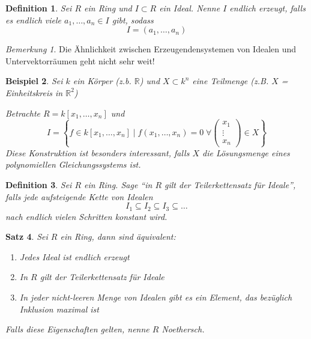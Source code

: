 \documentclass[a4paper,12pt,numbers=noenddot,parskip=full]{scrartcl}
\newcommand{\setR}{\mathbb{R}}
\theoremstyle{dotless}
\newtheorem{theorem}{Satz}[section]
\newtheorem{definition}[theorem]{Definition}
\newtheorem{example}[theorem]{Beispiel}
\theoremstyle{remark}
\newtheorem*{remark}{Bemerkung}
\begin{document}
	\begin{definition}
		Sei $R$ ein Ring und $I \subset R$ ein Ideal. Nenne $I$ endlich erzeugt, falls es endlich viele $a_1, \dots, a_n \in I$ gibt, sodass
		\begin{equation*}
			I = (a_1, \dots, a_n)
		\end{equation*}
	\end{definition}

	\begin{remark}
		Die Ähnlichkeit zwischen Erzeugendensystemen von Idealen und Untervektorräumen geht nicht sehr weit!
	\end{remark}

	\begin{example}
		Sei $k$ ein Körper (z.b. $\setR$) und $X \subset k^n$ eine Teilmenge (z.B. $X$ = Einheitskreis in $\setR^2$)
		
		Betrachte $R = k[x_1, \dots, x_n]$ und
		\begin{equation*}
			I = \left\{ f \in k[x_1, \dots, x_n] \mid f(x_1, \dots, x_n) = 0 \;\forall \begin{pmatrix}
				x_1 \\ \vdots \\ x_n
			\end{pmatrix} \in X \right\}
		\end{equation*}
		Diese Konstruktion ist besonders interessant, falls $X$ die Lösungsmenge eines polynomiellen Gleichungssystems ist.
	\end{example}

	\begin{definition}
		Sei $R$ ein Ring. Sage "`in $R$ gilt der Teilerkettensatz für Ideale"', falls jede aufsteigende Kette von Idealen
		\begin{equation*}
			I_1 \subseteq I_2 \subseteq I_3 \subseteq \dots
		\end{equation*}
		nach endlich vielen Schritten konstant wird.
	\end{definition}

	\begin{theorem}
		Sei $R$ ein Ring, dann sind äquivalent:
		\begin{enumerate}
			\item Jedes Ideal ist endlich erzeugt
			\item In $R$ gilt der Teilerkettensatz für Ideale
			\item In jeder nicht-leeren Menge von Idealen gibt es ein Element, das bezüglich Inklusion maximal ist
		\end{enumerate}
		Falls diese Eigenschaften gelten, nenne $R$ Noethersch.
	\end{theorem}
\end{document}
